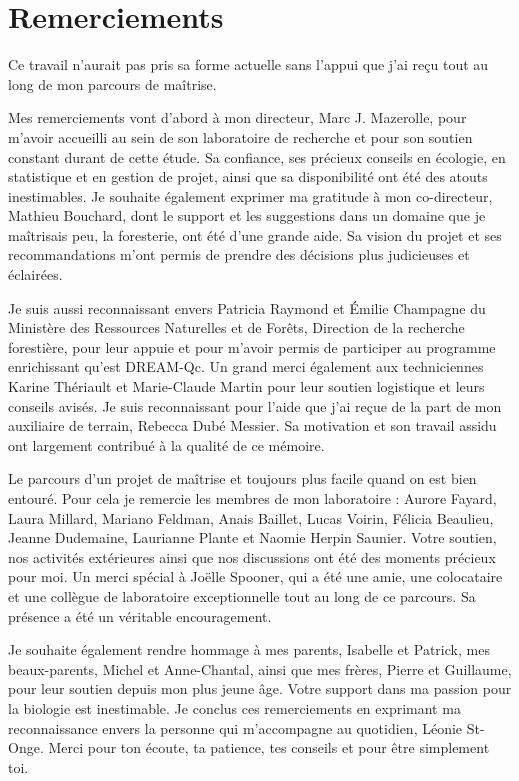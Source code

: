 \chapter*{Remerciements}        %
\label{chap-remerciements}      %


 Ce travail n'aurait pas pris sa forme actuelle sans l'appui que j'ai reçu tout au long de mon parcours de maîtrise.

 Mes remerciements vont d'abord à mon directeur, Marc J. Mazerolle, pour m'avoir accueilli au sein de son laboratoire de recherche et pour son soutien constant durant de cette étude. 
 Sa confiance, ses précieux conseils en écologie, en statistique et en gestion de projet, ainsi que sa disponibilité ont été des atouts inestimables.
 Je souhaite également exprimer ma gratitude à mon co-directeur, Mathieu Bouchard, dont le support et les suggestions dans un domaine que je maîtrisais peu, la foresterie, ont été d'une grande aide. 
 Sa vision du projet et ses recommandations m'ont permis de prendre des décisions plus judicieuses et éclairées.

 Je suis aussi reconnaissant envers Patricia Raymond et Émilie Champagne du Ministère des Ressources Naturelles et de Forêts, Direction de la recherche forestière, pour leur appuie et 
 pour m'avoir permis de participer au programme enrichissant qu'est DREAM-Qc.
 Un grand merci également aux techniciennes Karine Thériault et Marie-Claude Martin pour leur soutien logistique et leurs conseils avisés.
 Je suis reconnaissant pour l'aide que j'ai reçue de la part de mon auxiliaire de terrain, Rebecca Dubé Messier. Sa motivation et son travail assidu ont largement contribué à la qualité de ce mémoire.

 Le parcours d'un projet de maîtrise et toujours plus facile quand on est bien entouré. 
 Pour cela je remercie les membres de mon laboratoire : 
 Aurore Fayard, Laura Millard, Mariano Feldman, Anais Baillet, Lucas Voirin, Félicia Beaulieu, Jeanne Dudemaine, Laurianne Plante et Naomie Herpin Saunier. 
 Votre soutien, nos activités extérieures ainsi que nos discussions ont été des moments précieux pour moi.
 Un merci spécial à Joëlle Spooner, qui a été une amie, une colocataire et une collègue de laboratoire exceptionnelle tout au long de ce parcours. 
 Sa présence a été un véritable encouragement.

 Je souhaite également rendre hommage à mes parents, Isabelle et Patrick, mes beaux-parents, Michel et Anne-Chantal, ainsi que mes frères, Pierre et Guillaume, pour leur soutien depuis 
 mon plus jeune âge. Votre support dans ma passion pour la biologie est inestimable.
 Je conclus ces remerciements en exprimant ma reconnaissance envers la personne qui m'accompagne au quotidien, Léonie St-Onge. 
 Merci pour ton écoute, ta patience, tes conseils et pour être simplement toi.

